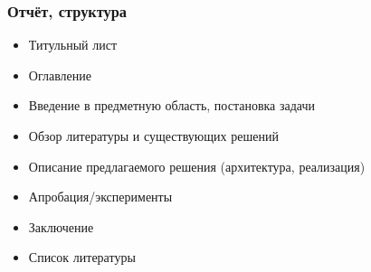 \documentclass{../../slides-style}
\begin{document}
    \begin{frame}
        \frametitle{Отчёт, структура}
        \begin{itemize}
            \item Титульный лист
            \item Оглавление
            \item Введение в предметную область, постановка задачи
            \item Обзор литературы и существующих решений
            \item Описание предлагаемого решения (архитектура, реализация)
            \item Апробация/эксперименты
            \item Заключение
            \item Список литературы
        \end{itemize}
    \end{frame}
\end{document}
